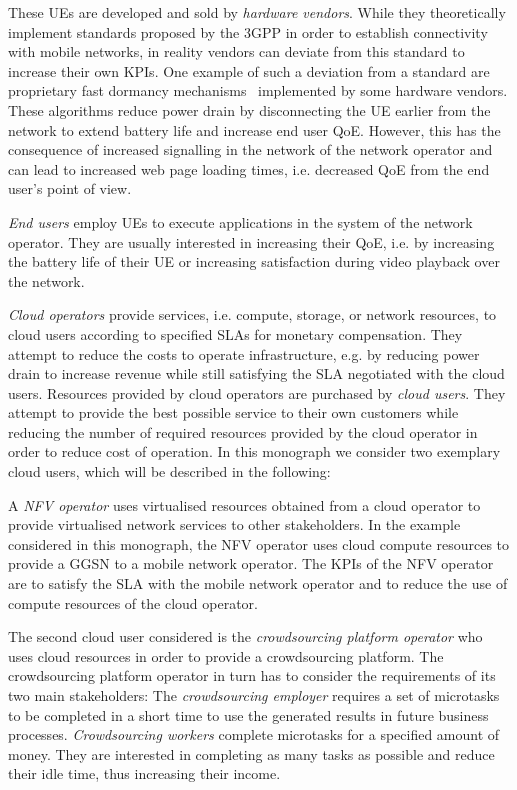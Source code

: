 These \glspl{UE} are developed and sold by \emph{hardware vendors}.
While they theoretically implement standards proposed by the \gls{3GPP} in order to establish connectivity with mobile networks, in reality vendors can deviate from this standard to increase their own \glspl{KPI}.
One example of such a deviation from a standard are proprietary fast dormancy mechanisms~\cite{GSM2010} implemented by some hardware vendors.
These algorithms reduce power drain by disconnecting the \gls{UE} earlier from the network to extend battery life and increase end user \gls{QoE}.
However, this has the consequence of increased signalling in the network of the network operator and can lead to increased web page loading times, i.e. decreased \gls{QoE} from the end user's point of view.

\emph{End users} employ \glspl{UE} to execute applications in the system of the network operator.
They are usually interested in increasing their \gls{QoE}, i.e. by increasing the battery life of their \gls{UE} or increasing satisfaction during video playback over the network.

\emph{Cloud operators} provide services, i.e. compute, storage, or network resources, to cloud users according to specified \glspl{SLA} for monetary compensation.
They attempt to reduce the costs to operate infrastructure, e.g. by reducing power drain to increase revenue while still satisfying the \gls{SLA} negotiated with the cloud users.
Resources provided by cloud operators are purchased by \emph{cloud users}.
They attempt to provide the best possible service to their own customers while reducing the number of required resources provided by the cloud operator in order to reduce cost of operation. In this monograph we consider two exemplary cloud users, which will be described in the following:

A \emph{\gls{NFV} operator} uses virtualised resources obtained from a cloud operator to provide virtualised network services to other stakeholders.
In the example considered in this monograph, the \gls{NFV} operator uses cloud compute resources to provide a \gls{GGSN} to a mobile network operator.
The \glspl{KPI} of the \gls{NFV} operator are to satisfy the \gls{SLA} with the mobile network operator and to reduce the use of compute resources of the cloud operator.

The second cloud user considered is the \emph{crowdsourcing platform operator} who uses cloud resources in order to provide a crowdsourcing platform.
The crowdsourcing platform operator in turn has to consider the requirements of its two main stakeholders:
The \emph{crowdsourcing employer} requires a set of microtasks to be completed in a short  time to use the generated results in future business processes.
\emph{Crowdsourcing workers} complete microtasks for a specified amount of money.
They are interested in completing as many tasks as possible and reduce their idle time, thus increasing their income.

